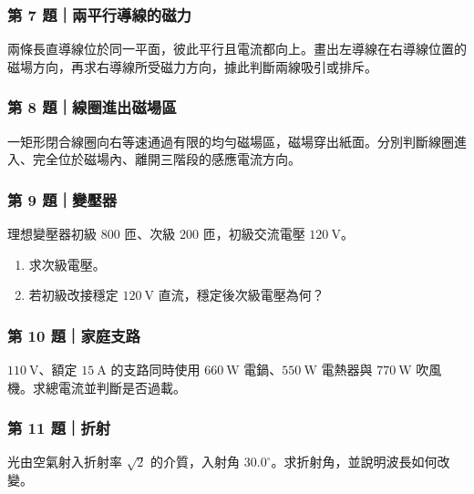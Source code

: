 \documentclass[11pt,a4paper]{article}
\providecommand{\tightlist}{%
  \setlength{\itemsep}{0pt}\setlength{\parskip}{0pt}}
\begin{document}
\subsubsection{第 7 題｜兩平行導線的磁力}\label{ux7b2c-7-ux984cux5169ux5e73ux884cux5c0eux7ddaux7684ux78c1ux529b}

兩條長直導線位於同一平面，彼此平行且電流都向上。畫出左導線在右導線位置的磁場方向，再求右導線所受磁力方向，據此判斷兩線吸引或排斥。

\subsubsection{第 8 題｜線圈進出磁場區}\label{ux7b2c-8-ux984cux7ddaux5708ux9032ux51faux78c1ux5834ux5340}

一矩形閉合線圈向右等速通過有限的均勻磁場區，磁場穿出紙面。分別判斷線圈進入、完全位於磁場內、離開三階段的感應電流方向。

\subsubsection{第 9 題｜變壓器}\label{ux7b2c-9-ux984cux8b8aux58d3ux5668}

理想變壓器初級 \(800\) 匝、次級 \(200\) 匝，初級交流電壓 \(120\ \mathrm V\)。

\begin{enumerate}
\def\labelenumi{\arabic{enumi}.}
\tightlist
\item
  求次級電壓。
\item
  若初級改接穩定 \(120\ \mathrm V\) 直流，穩定後次級電壓為何？
\end{enumerate}

\subsubsection{第 10 題｜家庭支路}\label{ux7b2c-10-ux984cux5bb6ux5eadux652fux8def}

\(110\ \mathrm V\)、額定 \(15\ \mathrm A\) 的支路同時使用 \(660\ \mathrm W\) 電鍋、\(550\ \mathrm W\) 電熱器與 \(770\ \mathrm W\) 吹風機。求總電流並判斷是否過載。

\subsubsection{第 11 題｜折射}\label{ux7b2c-11-ux984cux6298ux5c04}

光由空氣射入折射率 \(\sqrt2\) 的介質，入射角 \(30.0^\circ\)。求折射角，並說明波長如何改變。
\end{document}
